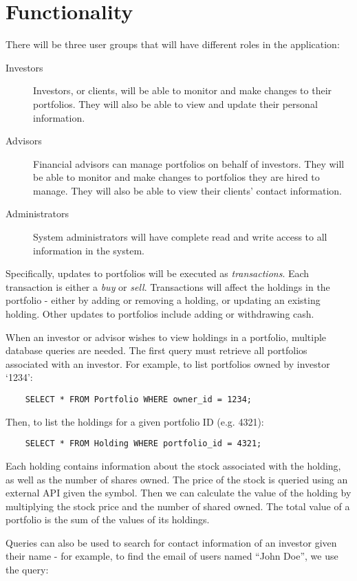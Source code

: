 \documentclass[letterpaper]{report}
\begin{document}
\section*{Functionality}
There will be three user groups that will have different roles in the application:
\begin{description}
	\item[Investors] Investors, or clients, will be able to monitor and make changes to their portfolios. They will also be able to view and update their personal information.
	\item[Advisors] Financial advisors can manage portfolios on behalf of investors. They will be able to monitor and make changes to portfolios they are hired to manage. They will also be able to view their clients' contact information.
	\item[Administrators] System administrators will have complete read and write access to all information in the system.
\end{description}

Specifically, updates to portfolios will be executed as {\em transactions}. Each transaction is either a {\em buy} or {\em sell}. Transactions will affect the holdings in the portfolio - either by adding or removing a holding, or updating an existing holding. Other updates to portfolios include adding or withdrawing cash.

When an investor or advisor wishes to view holdings in a portfolio, multiple database queries are needed. The first query must retrieve all portfolios associated with an investor. For example, to list portfolios owned by investor `1234':

\verb|    SELECT * FROM Portfolio WHERE owner_id = 1234;|

Then, to list the holdings for a given portfolio ID (e.g. 4321):

\verb|    SELECT * FROM Holding WHERE portfolio_id = 4321;|

Each holding contains information about the stock associated with the holding, as well as the number of shares owned. The price of the stock is queried using an external API given the symbol. Then we can calculate the value of the holding by multiplying the stock price and the number of shared owned. The total value of a portfolio is the sum of the values of its holdings.

Queries can also be used to search for contact information of an investor given their name - for example, to find the email of users named ``John Doe'', we use the query:
\end{document}
